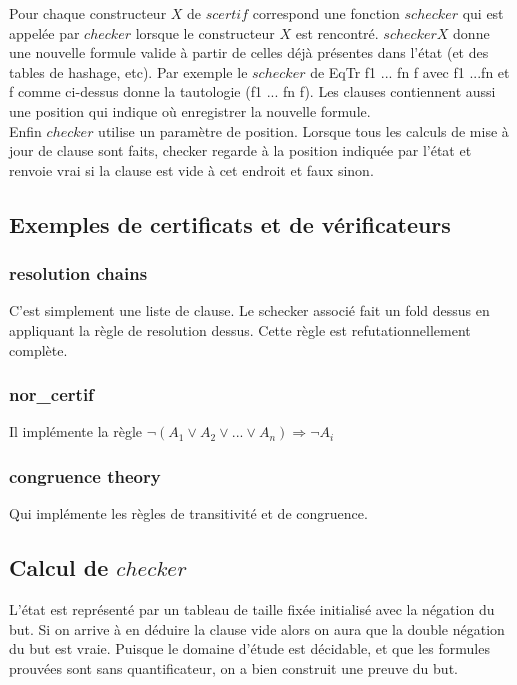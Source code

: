 \documentclass[11pt]{article}
\begin{document}
Pour chaque constructeur $X$ de $scertif$ correspond une fonction $schecker$ qui est appelée par $checker$ lorsque le constructeur $X$ est rencontré. $schecker X$ donne une nouvelle formule valide à partir de celles déjà présentes dans l'état (et des tables de hashage, etc). Par exemple le $schecker$ de EqTr f1 ... fn f avec f1 ...fn et f comme ci-dessus donne la tautologie (f1 \/ ... \/ fn \/ f). Les clauses contiennent aussi une position qui indique où enregistrer la nouvelle formule.\\

Enfin $checker$ utilise un paramètre de position. Lorsque tous les calculs de mise à jour de clause sont faits, checker regarde à la position indiquée par l'état et renvoie vrai si la clause est vide à cet endroit et faux sinon.

\subsection{Exemples de certificats et de vérificateurs}
\subsubsection{resolution chains}
C'est simplement une liste de clause.
Le schecker associé fait un fold dessus en appliquant la règle de resolution dessus. Cette règle est refutationnellement complète.

\subsubsection{nor\_certif}
Il implémente la règle $\neg (A_1 \vee A_2 \vee ... \vee A_n) \Rightarrow \neg A_i$

\subsubsection{congruence theory}
Qui implémente les règles de transitivité et de congruence.

\subsection{Calcul de $checker$} \label{alloc}
L'état est représenté par un tableau de taille fixée initialisé avec la négation du but. Si on arrive à en déduire la clause vide alors on aura que la double négation du but est vraie. Puisque le domaine d'étude est décidable, et que les formules prouvées sont sans quantificateur, on a bien construit une preuve du but. \\
\end{document}
